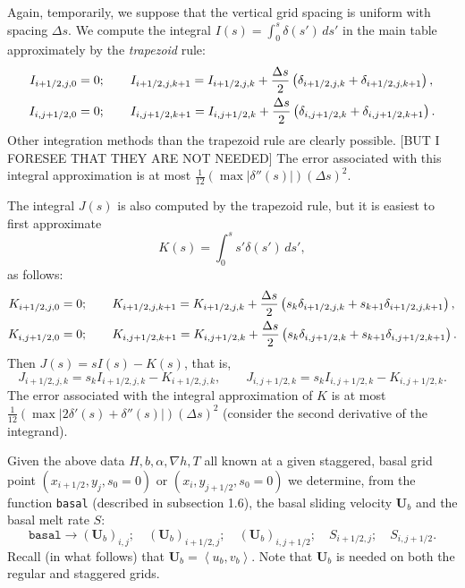 \documentclass[12pt,final]{amsart}%
\theoremstyle{plain}
\theoremstyle{definition}
\theoremstyle{remark}
\newcommand{\mtt}{\texttt}
\newcommand{\grad}{\nabla}
\newcommand{\ip}[2]{\ensuremath{\left<#1,#2\right>}}
\newcommand{\bU}{{\mathbf{U}}}
\begin{document}
Again, temporarily, we suppose that the vertical grid spacing is uniform with spacing $\Delta s$.  We compute the integral $I(s)=\int_0^s \delta(s')\,ds'$ in the main table approximately by the \emph{trapezoid} rule:
\begin{align}
I_{i+1/2,j,0}&=0; \qquad I_{i+1/2,j,k+1}= I_{i+1/2,j,k} + \frac{\Delta s}{2}\left(\delta_{i+1/2,j,k}+\delta_{i+1/2,j,k+1}\right), \notag\\
I_{i,j+1/2,0}&=0; \qquad I_{i,j+1/2,k+1}= I_{i,j+1/2,k} + \frac{\Delta s}{2}\left(\delta_{i,j+1/2,k}+\delta_{i,j+1/2,k+1}\right).\notag
\end{align}
Other integration methods than the trapezoid rule are clearly possible. [BUT I FORESEE THAT THEY ARE NOT NEEDED]   The error associated with this integral approximation is at most $\frac{1}{12} \left(\max |\delta''(s)|\right) (\Delta s)^2$.

The integral $J(s)$ is also computed by the trapezoid rule, but it is easiest to first approximate
    $$K(s)=\int_0^s s' \delta(s')\,ds',$$
as follows:
\begin{align}
K_{i+1/2,j,0}&=0; \qquad K_{i+1/2,j,k+1}= K_{i+1/2,j,k} + \frac{\Delta s}{2}\left(s_k \delta_{i+1/2,j,k}+s_{k+1}\delta_{i+1/2,j,k+1}\right), \notag\\
K_{i,j+1/2,0}&=0; \qquad K_{i,j+1/2,k+1}= K_{i,j+1/2,k} + \frac{\Delta s}{2}\left(s_k \delta_{i,j+1/2,k} + s_{k+1}\delta_{i,j+1/2,k+1}\right).\notag
\end{align}
Then $J(s)=sI(s)-K(s)$, that is,
\begin{equation}
  J_{i+1/2,j,k}=s_k I_{i+1/2,j,k} - K_{i+1/2,j,k}, \qquad J_{i,j+1/2,k}=s_k I_{i,j+1/2,k} - K_{i,j+1/2,k}.
\end{equation}
The error associated with the integral approximation of $K$ is at most $\frac{1}{12} \left(\max |2\delta'(s)+\delta''(s)|\right) (\Delta s)^2$ (consider the second derivative of the integrand).

Given the above data $H,b,\alpha,\grad h,T$ all known at a given staggered, basal grid point $(x_{i+1/2},y_j,s_0=0)$ or $(x_i,y_{j+1/2},s_0=0)$ we determine, from the function \mtt{basal} (described in subsection 1.6), the basal sliding velocity $\bU_b$ and the basal melt rate $S$:
\begin{equation}
  \mtt{basal} \to (\bU_b)_{i,j}; \quad (\bU_b)_{i+1/2,j};\quad (\bU_b)_{i,j+1/2}; \quad S_{i+1/2,j}; \quad S_{i,j+1/2}.
\end{equation}
Recall (in what follows) that $\bU_b=\ip{u_b}{v_b}$.  Note that $\bU_b$ is needed on both the regular and staggered grids.
\end{document}
